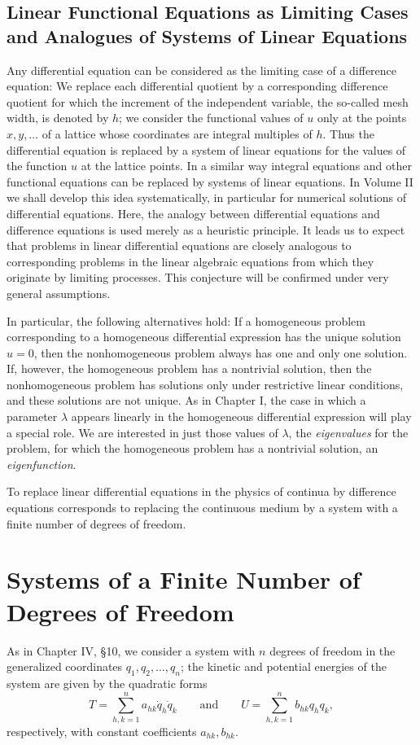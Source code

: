 \subsection{Linear Functional Equations as Limiting Cases and Analogues of Systems of Linear Equations}
Any differential equation can be considered as the limiting case of a difference equation: We replace each differential quotient by a corresponding difference quotient for which the increment of the independent variable, the so-called mesh width, is denoted by $h$; we consider the functional values of $u$ only at the points $x,y,\ldots$ of a lattice whose coordinates are integral multiples of $h$. Thus the differential equation is replaced by a system of linear equations for the values of the function $u$ at the lattice points. In a similar way integral equations and other functional equations can be replaced by systems of linear equations. In Volume II we shall develop this idea systematically, in particular for numerical solutions of differential equations. Here, the analogy between differential equations and difference equations is used merely as a heuristic principle. It leads us to expect that problems in linear differential equations are closely analogous to corresponding problems in the linear algebraic equations from which they originate by limiting processes. This conjecture will be confirmed under very general assumptions.

In particular, the following alternatives hold: If a homogeneous problem corresponding to a homogeneous differential expression has the unique solution $u=0$, then the nonhomogeneous problem always has one and only one solution. If, however, the homogeneous problem has a nontrivial solution, then the nonhomogeneous problem has solutions only under restrictive linear conditions, and these solutions are not unique. As in Chapter I, the case in which a parameter $\lambda$ appears linearly in the homogeneous differential expression will play a special role. We are interested in just those values of $\lambda$, the \emph{eigenvalues} for the problem, for which the homogeneous problem has a nontrivial solution, an \emph{eigenfunction}.

To replace linear differential equations in the physics of continua by difference equations corresponds to replacing the continuous medium by a system with a finite number of degrees of freedom.

\section{Systems of a Finite Number of Degrees of Freedom}
As in Chapter IV, \S10, we consider a system with $n$ degrees of freedom in the generalized coordinates $q_1,q_2,\ldots,q_n$; the kinetic and potential energies of the system are given by the quadratic forms
\[
T=\sum_{h,k=1}^n a_{hk}\dot q_h\dot q_k
\qquad\text{and}\qquad
U=\sum_{h,k=1}^n b_{hk}q_hq_k,
\]
respectively, with constant coefficients $a_{hk},b_{hk}$.

